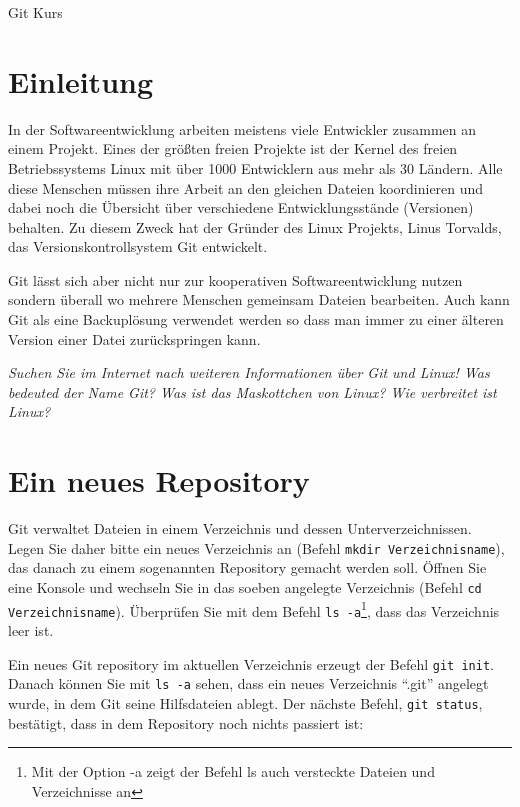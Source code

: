 \documentclass[11pt,a4paper,twoside]{scrartcl}
\begin{document}
\begin{center}
  {\LARGE Git Kurs \par}
\end{center}

\section{Einleitung}

In der Softwareentwicklung arbeiten meistens viele Entwickler zusammen an
einem Projekt. Eines der größten freien Projekte ist der Kernel des freien
Betriebssystems Linux mit über 1000 Entwicklern aus mehr als 30 Ländern. Alle
diese Menschen müssen ihre Arbeit an den gleichen Dateien koordinieren und
dabei noch die Übersicht über verschiedene Entwicklungsstände (Versionen)
behalten. Zu diesem Zweck hat der Gründer des Linux Projekts, Linus Torvalds,
das Versionskontrollsystem Git entwickelt.

Git lässt sich aber nicht nur zur kooperativen Softwareentwicklung nutzen
sondern überall wo mehrere Menschen gemeinsam Dateien bearbeiten. Auch kann
Git als eine Backuplösung verwendet werden so dass man immer zu einer älteren
Version einer Datei zurückspringen kann.

\emph{Suchen Sie im Internet nach weiteren Informationen über Git und Linux!
  Was bedeuted der Name Git? Was ist das Maskottchen von Linux? Wie verbreitet
  ist Linux?}

\section{Ein neues Repository}

Git verwaltet Dateien in einem Verzeichnis und dessen
Unterverzeichnissen. Legen Sie daher bitte ein neues Verzeichnis an (Befehl
\lstinline{mkdir Verzeichnisname}), das danach zu einem sogenannten Repository
gemacht werden soll. Öffnen Sie eine Konsole und wechseln Sie in das soeben
angelegte Verzeichnis (Befehl \lstinline{cd Verzeichnisname}). Überprüfen Sie
mit dem Befehl \lstinline{ls -a}\footnote{Mit der Option -a zeigt der Befehl ls auch versteckte Dateien und
  Verzeichnisse an}, dass das Verzeichnis leer ist.

Ein neues Git repository im aktuellen Verzeichnis erzeugt der Befehl
\lstinline{git init}. Danach können Sie mit \lstinline{ls -a} sehen, dass ein
neues Verzeichnis ``.git'' angelegt wurde, in dem Git seine Hilfsdateien
ablegt. Der nächste Befehl, \lstinline{git status}, bestätigt, dass in dem
Repository noch nichts passiert ist:
\end{document}
